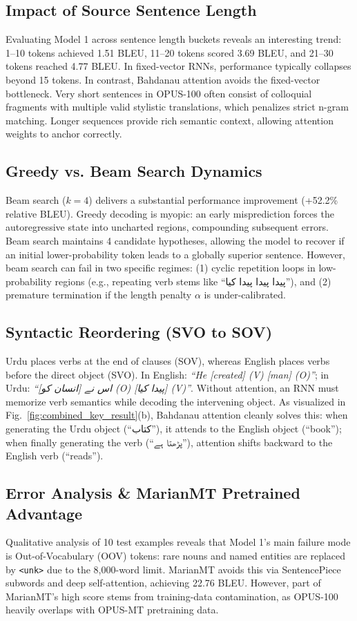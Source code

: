 \documentclass[conference]{IEEEtran}
\begin{document}
\subsection{Impact of Source Sentence Length}
Evaluating Model 1 across sentence length buckets reveals an interesting trend: 1--10 tokens achieved 1.51 BLEU, 11--20 tokens scored 3.69 BLEU, and 21--30 tokens reached 4.77 BLEU. In fixed-vector RNNs, performance typically collapses beyond 15 tokens. In contrast, Bahdanau attention avoids the fixed-vector bottleneck. Very short sentences in OPUS-100 often consist of colloquial fragments with multiple valid stylistic translations, which penalizes strict n-gram matching. Longer sequences provide rich semantic context, allowing attention weights to anchor correctly.

\subsection{Greedy vs. Beam Search Dynamics}
Beam search ($k=4$) delivers a substantial performance improvement (+52.2\% relative BLEU). Greedy decoding is myopic: an early misprediction forces the autoregressive state into uncharted regions, compounding subsequent errors. Beam search maintains 4 candidate hypotheses, allowing the model to recover if an initial lower-probability token leads to a globally superior sentence. However, beam search can fail in two specific regimes: (1) cyclic repetition loops in low-probability regions (e.g., repeating verb stems like ``پیدا پیدا پیدا کیا''), and (2) premature termination if the length penalty $\alpha$ is under-calibrated.

\subsection{Syntactic Reordering (SVO to SOV)}
Urdu places verbs at the end of clauses (SOV), whereas English places verbs before the direct object (SVO). In English: \textit{``He [created] (V) [man] (O)''}; in Urdu: \textit{``اس نے [انسان کو] (O) [پیدا کیا] (V)''}. Without attention, an RNN must memorize verb semantics while decoding the intervening object. As visualized in Fig.~\ref{fig:combined_key_result}(b), Bahdanau attention cleanly solves this: when generating the Urdu object (``کتاب''), it attends to the English object (``book''); when finally generating the verb (``پڑھتا ہے''), attention shifts backward to the English verb (``reads'').

\subsection{Error Analysis & MarianMT Pretrained Advantage}
Qualitative analysis of 10 test examples reveals that Model 1's main failure mode is Out-of-Vocabulary (OOV) tokens: rare nouns and named entities are replaced by \texttt{<unk>} due to the 8,000-word limit. MarianMT avoids this via SentencePiece subwords and deep self-attention, achieving 22.76 BLEU. However, part of MarianMT's high score stems from training-data contamination, as OPUS-100 heavily overlaps with OPUS-MT pretraining data.
\end{document}
